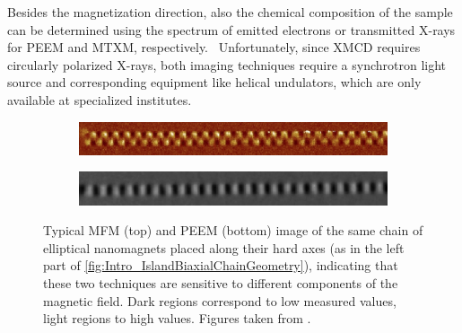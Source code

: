 \documentclass[11pt,a4paper,english]{article}
\begin{document}
Besides the magnetization direction, also the chemical composition of the sample can be determined using the spectrum of emitted electrons or transmitted X-rays for PEEM and MTXM, respectively.~\cite{PEEM,Imaging_MTXM} Unfortunately, since XMCD requires circularly polarized X-rays, both imaging techniques require a synchrotron light source and corresponding equipment like helical undulators, which are only available at specialized institutes.

\begin{figure}
     \centering
     \begin{subfigure}[b]{0.8\textwidth}
         \centering
         \includegraphics[width=\textwidth]{Figures/Introduction/NML_Carlton - Figure 1.15 cropped.png}
     \end{subfigure}
     \begin{subfigure}[b]{0.8\textwidth}
         \centering
         \includegraphics[width=\textwidth]{Figures/Introduction/NML_Carlton - Figure 1.17 cropped.png}
     \end{subfigure}
     \caption{Typical MFM (top) and PEEM (bottom) image of the same chain of elliptical nanomagnets placed along their hard axes (as in the left part of \cref{fig:Intro_IslandBiaxialChainGeometry}), indicating that these two techniques are sensitive to different components of the magnetic field. Dark regions correspond to low measured values, light regions to high values. Figures taken from \cite{NML_Carlton}.}
     \label{fig:Intro_Imaging}
\end{figure}
\end{document}
